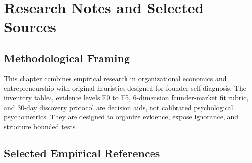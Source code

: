 \section{Research Notes and Selected Sources}

\subsection{Methodological Framing}

This chapter combines empirical research in organizational economics and entrepreneurship with original heuristics designed for founder self-diagnosis. The inventory tables, evidence levels E0 to E5, 6-dimension founder-market fit rubric, and 30-day discovery protocol are decision aids, not calibrated psychological psychometrics. They are designed to organize evidence, expose ignorance, and structure bounded tests.

\subsection{Selected Empirical References}

